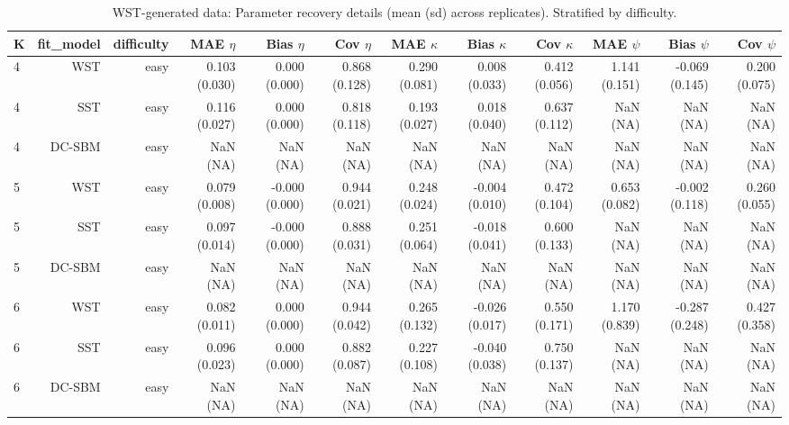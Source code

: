 \begin{table}[!h]
\centering
\caption{WST-generated data: Parameter recovery details (mean (sd) across replicates). Stratified by difficulty.\\\label{tab:wst-appx-params}}
\centering
\begin{tabular}[t]{lrrrrrrrrrrr}
\toprule
K & fit_model & difficulty & MAE $\eta$ & Bias $\eta$ & Cov $\eta$ & MAE $\kappa$ & Bias $\kappa$ & Cov $\kappa$ & MAE $\psi$ & Bias $\psi$ & Cov $\psi$\\
\midrule
4 & WST & easy & 0.103 (0.030) & 0.000 (0.000) & 0.868 (0.128) & 0.290 (0.081) & 0.008 (0.033) & 0.412 (0.056) & 1.141 (0.151) & -0.069 (0.145) & 0.200 (0.075)\\
4 & SST & easy & 0.116 (0.027) & 0.000 (0.000) & 0.818 (0.118) & 0.193 (0.027) & 0.018 (0.040) & 0.637 (0.112) & NaN (NA) & NaN (NA) & NaN (NA)\\
4 & DC-SBM & easy & NaN (NA) & NaN (NA) & NaN (NA) & NaN (NA) & NaN (NA) & NaN (NA) & NaN (NA) & NaN (NA) & NaN (NA)\\
5 & WST & easy & 0.079 (0.008) & -0.000 (0.000) & 0.944 (0.021) & 0.248 (0.024) & -0.004 (0.010) & 0.472 (0.104) & 0.653 (0.082) & -0.002 (0.118) & 0.260 (0.055)\\
5 & SST & easy & 0.097 (0.014) & -0.000 (0.000) & 0.888 (0.031) & 0.251 (0.064) & -0.018 (0.041) & 0.600 (0.133) & NaN (NA) & NaN (NA) & NaN (NA)\\
5 & DC-SBM & easy & NaN (NA) & NaN (NA) & NaN (NA) & NaN (NA) & NaN (NA) & NaN (NA) & NaN (NA) & NaN (NA) & NaN (NA)\\
6 & WST & easy & 0.082 (0.011) & 0.000 (0.000) & 0.944 (0.042) & 0.265 (0.132) & -0.026 (0.017) & 0.550 (0.171) & 1.170 (0.839) & -0.287 (0.248) & 0.427 (0.358)\\
6 & SST & easy & 0.096 (0.023) & 0.000 (0.000) & 0.882 (0.087) & 0.227 (0.108) & -0.040 (0.038) & 0.750 (0.137) & NaN (NA) & NaN (NA) & NaN (NA)\\
6 & DC-SBM & easy & NaN (NA) & NaN (NA) & NaN (NA) & NaN (NA) & NaN (NA) & NaN (NA) & NaN (NA) & NaN (NA) & NaN (NA)\\
\bottomrule
\end{tabular}
\end{table}

